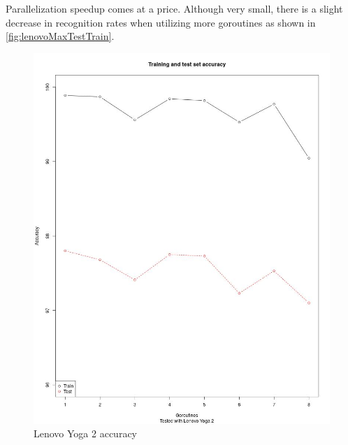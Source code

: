 \documentclass[11pt]{article}
\begin{document}
Parallelization speedup comes at a price. Although very small, there is a slight decrease in recognition rates when utilizing more goroutines as shown in \autoref{fig:lenovoMaxTestTrain}.
\begin{figure}[H]
	\centering
	\includegraphics[width=1.0\textwidth, height=0.75\textheight]{./Data/Final/Images/lenovoMaxTestTrain.jpg}
	\vspace{-1em}
	\caption{Lenovo Yoga 2 accuracy}
	\vspace{-0.5em}
	\label{fig:lenovoMaxTestTrain}
\end{figure}
\end{document}
